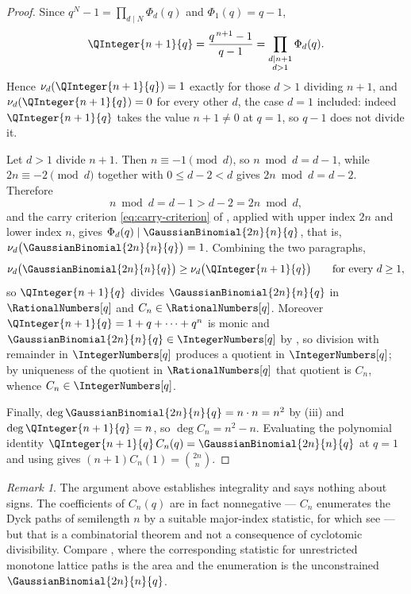 \documentclass[11pt,a4paper,oneside,openany]{book}
\theoremstyle{definition}
\theoremstyle{remark}
\newtheorem{remark}[remark]{Remark}
\begin{document}
\begin{proof}
Since $q^{N}-1=\prod_{d\mid N}\Phi_d(q)$ and $\Phi_1(q)=q-1$,
\[
 \QInteger{n+1}{q}=\frac{q^{\,n+1}-1}{q-1}
 =\prod_{\substack{d\mid n+1\\ d>1}}\Phi_d(q).
\]
Hence $\nu_d(\QInteger{n+1}{q})=1$ exactly for those $d>1$ dividing $n+1$, and
$\nu_d(\QInteger{n+1}{q})=0$ for every other $d$, the case $d=1$ included: indeed
$\QInteger{n+1}{q}$ takes the value $n+1\ne0$ at $q=1$, so $q-1$ does not divide it.

Let $d>1$ divide $n+1$.  Then $n\equiv-1\pmod d$, so $n\bmod d=d-1$, while
$2n\equiv-2\pmod d$ together with $0\le d-2<d$ gives $2n\bmod d=d-2$.
Therefore
\[
 n\bmod d=d-1>d-2=2n\bmod d,
\]
and the carry criterion \eqref{eq:carry-criterion} of
, applied with upper index $2n$ and lower
index $n$, gives $\Phi_d(q)\mid\GaussianBinomial{2n}{n}{q}$, that is,
$\nu_d\bigl(\GaussianBinomial{2n}{n}{q}\bigr)=1$.  Combining the two paragraphs,
\[
 \nu_d\bigl(\GaussianBinomial{2n}{n}{q}\bigr)\ge\nu_d\bigl(\QInteger{n+1}{q}\bigr)
 \qquad\text{for every }d\ge1,
\]
so $\QInteger{n+1}{q}$ divides $\GaussianBinomial{2n}{n}{q}$ in $\RationalNumbers[q]$ and $C_n\in\RationalNumbers[q]$.
Moreover $\QInteger{n+1}{q}=1+q+\cdots+q^{n}$ is monic and
$\GaussianBinomial{2n}{n}{q}\in\IntegerNumbers[q]$ by , so division with remainder
in $\IntegerNumbers[q]$ produces a quotient in $\IntegerNumbers[q]$; by uniqueness of the quotient in
$\RationalNumbers[q]$ that quotient is $C_n$, whence $C_n\in\IntegerNumbers[q]$.

Finally, $\deg\GaussianBinomial{2n}{n}{q}=n\cdot n=n^2$ by
(iii) and $\deg\QInteger{n+1}{q}=n$, so
$\deg C_n=n^2-n$.  Evaluating the polynomial identity
$\QInteger{n+1}{q}\,C_n(q)=\GaussianBinomial{2n}{n}{q}$ at $q=1$ and using
 gives $(n+1)C_n(1)=\binom{2n}{n}$.
\end{proof}

\begin{remark}\label{rem:q-catalan-positivity}
The argument above establishes integrality and says nothing about signs.  The
coefficients of $C_n(q)$ are in fact nonnegative --- $C_n$ enumerates the
Dyck paths of semilength $n$ by a suitable major-index statistic, for which
see \cite{Stanley1999} --- but that is a combinatorial theorem and not a
consequence of cyclotomic divisibility.  Compare , where
the corresponding statistic for unrestricted monotone lattice paths is the
area and the enumeration is the unconstrained $\GaussianBinomial{2n}{n}{q}$.
\end{remark}
\end{document}
